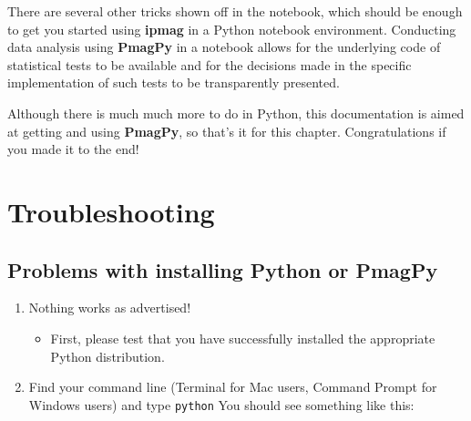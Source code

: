 \documentclass[11pt]{book}
\begin{document}
{{{There are several other tricks shown off in the notebook, which should be enough to get you started using {\bf ipmag} in a Python notebook environment.  Conducting data analysis  using {\bf PmagPy} in a notebook allows for the underlying code of statistical tests to be available and for the decisions made in the specific implementation of such tests to be transparently presented.

Although there is much much more to do in Python, this documentation is aimed at getting and using {\bf PmagPy}, so that's it for this chapter. Congratulations if you made it to the end!



\chapter{Troubleshooting}
\label{chap:trouble}

\section{Problems with installing Python or PmagPy}

\begin{enumerate}

 \item Nothing works as advertised!


\begin{itemize}

\item First, please test that you have successfully installed the appropriate Python distribution.
\end{itemize}

\item Find your command line (Terminal for Mac users, Command Prompt for Windows users) and type \texttt{python}  You should see something like this:





\end{enumerate}}}}
\end{document}
